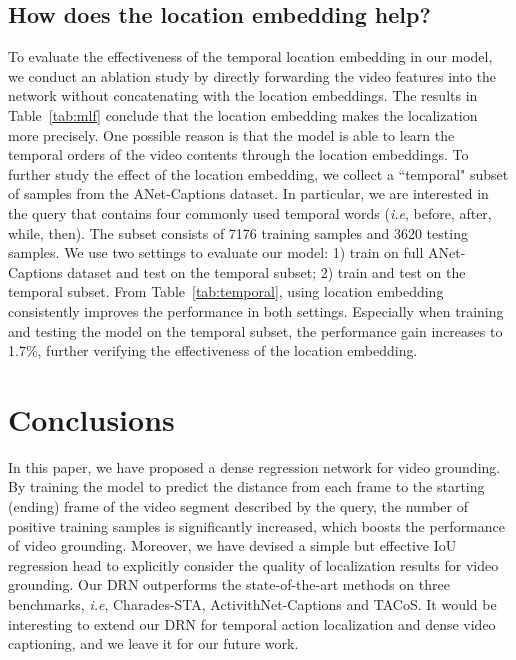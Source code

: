 \documentclass[10pt,twocolumn,letterpaper]{article}
\def\ie{\emph{i.e}\onedot} \def\Ie{\emph{I.e}\onedot}
\begin{document}
	
	
	
	\subsection{How does the location embedding help?}
	
	To evaluate the effectiveness of the temporal location embedding in our model, we conduct an ablation study by directly forwarding the video features into the network without concatenating with the location embeddings. The results in Table~\ref{tab:mlf} conclude that the location embedding makes the localization more precisely. One possible reason is that the model is able to learn the temporal orders of the video contents through the location embeddings.
	To further study the effect of the location embedding, we collect a ``temporal" subset of samples from the ANet-Captions dataset. In particular, we are interested in the query that contains four commonly used temporal words (\ie, before, after, while, then). The subset consists of 7176 training samples and 3620 testing samples. We use two settings to evaluate our model: 1) train on full ANet-Captions dataset and test on the temporal subset; 2) train and test on the temporal subset. From Table~\ref{tab:temporal}, using location embedding consistently improves the performance in both settings. Especially when training and testing the model on the temporal subset, the performance gain increases to 1.7\%, further verifying the effectiveness of the location embedding.
	


	\section{Conclusions}
	\label{sec:conclusions}
	
	In this paper, we have proposed a dense regression network for video grounding.
	By training the model to predict the distance from each frame to the starting (ending) frame of the video segment described by the query, the number of positive training samples is significantly increased, which boosts the performance of video grounding. Moreover, we have devised a simple but effective IoU regression head to explicitly consider the quality of localization results for video grounding.
	Our DRN outperforms the state-of-the-art methods on three benchmarks, \ie, Charades-STA, ActivithNet-Captions and TACoS. It would be interesting to extend our DRN for temporal action localization and dense video captioning, and we leave it for our future work.
	
\end{document}
